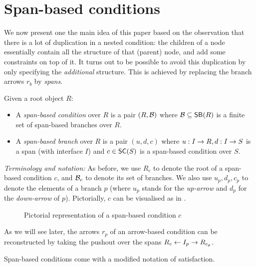 \section{Span-based conditions}

We now present one the main idea of this paper based on the observation that there is a lot of duplication in a nested condition: the children of a node essentially contain all the structure of that (parent) node, and add some constraints on top of it. It turns out to be possible to avoid this duplication by only specifying the \emph{additional} structure. This is achieved by replacing the branch arrows $r_b$ by \emph{spans}.


\begin{definition}
  Given a root object $R$:
  \begin{itemize}
  \item A \emph{span-based condition} over $R$ is a pair $(R,\mathcal{B})$ where $\cB\subseteq \SB R$ is a finite set of span-based branches over $R$.
  \item A \emph{span-based branch} over $R$ is a pair $(u,d,c)$ where $u:I\rightarrow R,d:I\rightarrow S$ is a span (with interface $I$) and $c\in \SC S$ is a span-based condition over $S$.
  \end{itemize}
\end{definition}
%
\emph{Terminology and notation:} As before, we use $R_c$ to denote the root of a span-based condition $c$, and $\mathcal{B}_c$ to denote its set of branches. We also use $u_p,d_p,c_p$ to denote the elements of a branch $p$ (where $u_p$ stands for the \emph{up-arrow} and $d_p$ for the \emph{down-arrow} of $p$). Pictorially, $c$ can be visualised as in .
%
\begin{figure}
  \centering
  
  \caption{Pictorial representation of a span-based condition $c$}
\end{figure}
%
As we will see later, the arrows $r_p$ of an arrow-based condition can be reconstructed by taking the pushout over the spans $R_c\leftarrow I_p\rightarrow R_{c_p}$.

\medskip\noindent Span-based conditions come with a modified notation of satisfaction.

